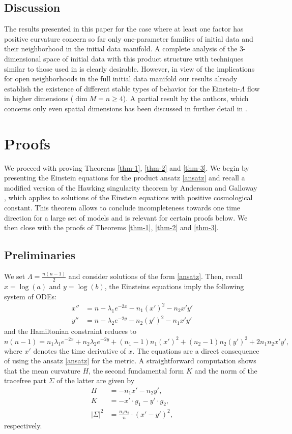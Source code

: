 \documentclass[a4paper,10pt]{article}
\theoremstyle{plain}
\theoremstyle{definition}
\theoremstyle{remark}
\theoremstyle{plain}
\newcommand{\eq}[1]{\begin{equation}#1\end{equation}}
\newcommand{\alg}[1]{\begin{aligned}#1\end{aligned}}
\newcommand{\Si}{\Sigma}
\newcommand{\La}{\Lambda}
\numberwithin{equation}{section}
\begin{document}
\subsection{Discussion}
The results presented in this paper for the case where at least one factor has positive curvature concern so far only one-parameter families of initial data and their neighborhood in the initial data manifold. A complete analysis of the 3-dimensional space of initial data with this product structure with techniques similar to those used in \cite{AnHe07} is clearly desirable. However, in view of the implications for open neighborhoods in the full initial data manifold our results already establish the existence of different stable types of behavior for the Einstein-$\La$ flow in higher dimensions ($\dim M=n\geq 4$). A partial result by the authors, which concerns only even spatial dimensions has been discussed in further detail in \cite{FaKr15}.

\section{Proofs}
We proceed with proving Theorems \ref{thm-1}, \ref{thm-2} and \ref{thm-3}. We begin by presenting the Einstein equations for the product ansatz \eqref{ansatz} and recall a modified version of the Hawking singularity theorem by Andersson and Galloway \cite{AnGa04}, which applies to solutions of the Einstein equations with positive cosmological constant. This theorem allows to conclude incompleteness towards one time direction for a large set of models and is relevant for certain proofs below. We then close with the proofs of Theorems \ref{thm-1}, \ref{thm-2} and \ref{thm-3}.
\subsection{Preliminaries}
We set $\Lambda=\frac{n(n-1)}{2}$ and consider solutions of the form \eqref{ansatz}.
Then, recall $x=\log(a)$ and $y=\log(b)$, the Einsteins equations imply the following system of ODEs:
\eq{\label{eq : wp-ev}\alg{
		x''&=n-\lambda_1e^{-2x}-n_1(x')^2-n_2x'y'\\
		y''&=n-\lambda_2e^{-2y}- n_2(y')^2-n_1x'y'
	}}
and the Hamiltonian constraint reduces to
\eq{n(n-1)=n_1\lambda_1e^{-2x}+n_2\lambda_2e^{-2y}+(n_1-1)n_1(x')^2+(n_2-1)n_2(y')^2+2n_1n_2x'y',}
where $x'$ denotes the time derivative of $x$. 
The equations are a direct consequence of \cite[Proposition 2.5]{DoUe05} using the ansatz \eqref{ansatz} for the metric.
A straightforward computation shows that the mean curvature $H$, the second fundamental form $K$ and the norm of the tracefree part $\Si$ of the latter are given by
\eq{\alg{
H&=-n_1x'-n_2y',\\
K&=-x'\cdot g_1-y'\cdot g_2,\\
|\Si|^2&= \frac{n_1n_2}{n}\cdot (x'-y')^2,
}}
respectively.
\end{document}
